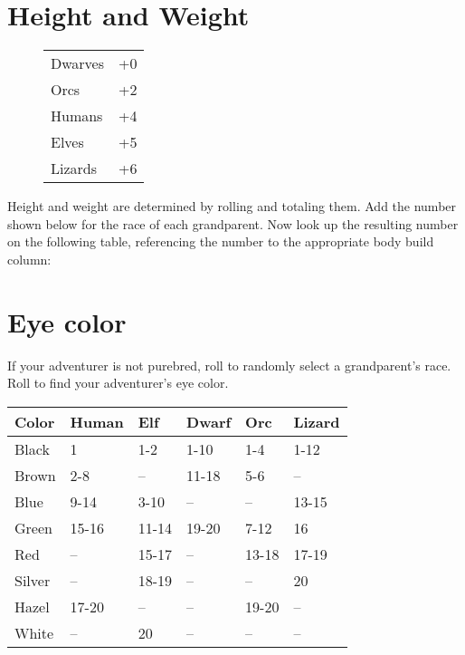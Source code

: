 \begin{multicols*}{2}
\section{Height and Weight}
\begin{wrapfigure}[7]{l}[0pt]{60pt}
\begin{normbox}
\small
{}
\begin{tabular}{@{}l l}
Dwarves & +0\\
Orcs & +2\\
Humans & +4\\
Elves & +5\\
Lizards & +6\\
\end{tabular}
\end{normbox}
\end{wrapfigure}

\normalsize
Height and weight are determined by rolling  and totaling them. Add the number shown below for the race of each grandparent. Now look up the resulting number on the following table, referencing the number to the appropriate body build column:

\begin{tcbraster}[raster columns=1,boxrule=0pt,title=\small\textbf{Height and Weight Table},left=0pt,right=0pt,top=0pt,bottom=0pt,boxsep=0pt,boxrule=0.6pt,lefttitle=2.5mm,toptitle=1mm,bottomtitle=1mm,colbacktitle=Navy,colback=white]
\end{tcbraster}
\normalsize
\section{Eye color}
If your adventurer is not purebred, roll  to randomly select a grandparent's race. Roll  to find your adventurer's eye color.

\begin{normboxc}
\small
\begin{tabular}{@{}l l l l l l}
\textbf{Color} & \textbf{Human} & \textbf{Elf} & \textbf{Dwarf} & \textbf{Orc} & \textbf{Lizard}\\
\midrule
Black & 1 & 1-2 & 1-10 & 1-4 & 1-12\\
Brown & 2-8 & -- & 11-18 & 5-6 & --\\
Blue & 9-14 & 3-10 & -- & -- & 13-15\\
Green & 15-16 & 11-14 & 19-20 & 7-12 & 16\\
Red & -- & 15-17 & -- & 13-18 & 17-19\\
Silver & -- & 18-19 & -- & -- & 20\\
Hazel & 17-20 & -- & -- & 19-20 & --\\
White & -- & 20 & -- & -- & --
\end{tabular}
\end{normboxc}

\end{multicols*}
